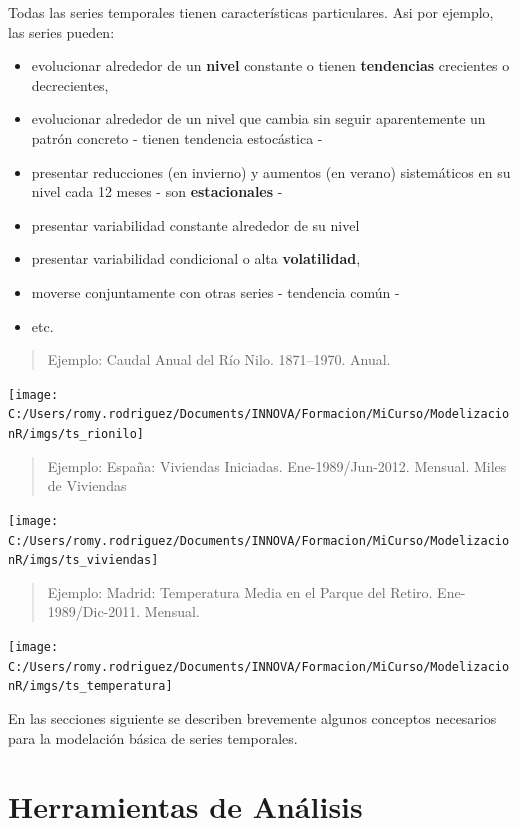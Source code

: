 \documentclass[]{book}
\providecommand{\tightlist}{%
  \setlength{\itemsep}{0pt}\setlength{\parskip}{0pt}}
\begin{document}
Todas las series temporales tienen características particulares. Asi por ejemplo, las series pueden:

\begin{itemize}
\tightlist
\item
  evolucionar alrededor de un \textbf{nivel} constante o tienen \textbf{tendencias} crecientes o decrecientes,
\item
  evolucionar alrededor de un nivel que cambia sin seguir aparentemente un patrón concreto - tienen tendencia estocástica -
\item
  presentar reducciones (en invierno) y aumentos (en verano) sistemáticos en su nivel cada 12 meses - son \textbf{estacionales} -
\item
  presentar variabilidad constante alrededor de su nivel
\item
  presentar variabilidad condicional o alta \textbf{volatilidad},
\item
  moverse conjuntamente con otras series - tendencia común -
\item
  etc.
\end{itemize}

\begin{quote}
Ejemplo: Caudal Anual del Río Nilo. 1871--1970. Anual.
\end{quote}

\texttt{[image: C:/Users/romy.rodriguez/Documents/INNOVA/Formacion/MiCurso/ModelizacionR/imgs/ts\_rionilo]}

\begin{quote}
Ejemplo: España: Viviendas Iniciadas. Ene-1989/Jun-2012. Mensual. Miles de Viviendas
\end{quote}

\texttt{[image: C:/Users/romy.rodriguez/Documents/INNOVA/Formacion/MiCurso/ModelizacionR/imgs/ts\_viviendas]}

\begin{quote}
Ejemplo: Madrid: Temperatura Media en el Parque del Retiro. Ene-1989/Dic-2011. Mensual.
\end{quote}

\texttt{[image: C:/Users/romy.rodriguez/Documents/INNOVA/Formacion/MiCurso/ModelizacionR/imgs/ts\_temperatura]}

En las secciones siguiente se describen brevemente algunos conceptos necesarios para la modelación básica de series temporales.

\hypertarget{herramientas-de-analisis}{%
\section{Herramientas de Análisis}\label{herramientas-de-analisis}}
\end{document}
